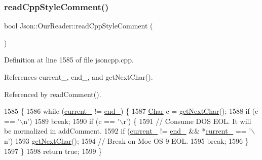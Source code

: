 \mbox{\label{class_json_1_1_our_reader_ae3de80671f0f997053e1c1c8a47a45c5}} 
\subsubsection{\texorpdfstring{read\+Cpp\+Style\+Comment()}{readCppStyleComment()}}
{\footnotesize\ttfamily bool Json\+::\+Our\+Reader\+::read\+Cpp\+Style\+Comment (\begin{DoxyParamCaption}{ }\end{DoxyParamCaption})\hspace{0.3cm}{\ttfamily [private]}}



Definition at line 1585 of file jsoncpp.\+cpp.



References current\+\_\+, end\+\_\+, and get\+Next\+Char().



Referenced by read\+Comment().


\begin{DoxyCode}
1585                                     \{
1586   \textcolor{keywordflow}{while} (\hyperlink{class_json_1_1_our_reader_a5211fbbba94be80a22dd2317c621efcc}{current\_} != \hyperlink{class_json_1_1_our_reader_ab1f69b0260c27a0d2d65dc56e42c8f9d}{end\_}) \{
1587     \hyperlink{class_json_1_1_our_reader_a0cd0bab4caa66594ab843ccd5f9dc239}{Char} c = \hyperlink{class_json_1_1_our_reader_a298285d035fdbc554caae09d9f0a5859}{getNextChar}();
1588     \textcolor{keywordflow}{if} (c == \textcolor{charliteral}{'\(\backslash\)n'})
1589       \textcolor{keywordflow}{break};
1590     \textcolor{keywordflow}{if} (c == \textcolor{charliteral}{'\(\backslash\)r'}) \{
1591       \textcolor{comment}{// Consume DOS EOL. It will be normalized in addComment.}
1592       \textcolor{keywordflow}{if} (\hyperlink{class_json_1_1_our_reader_a5211fbbba94be80a22dd2317c621efcc}{current\_} != \hyperlink{class_json_1_1_our_reader_ab1f69b0260c27a0d2d65dc56e42c8f9d}{end\_} && *\hyperlink{class_json_1_1_our_reader_a5211fbbba94be80a22dd2317c621efcc}{current\_} == \textcolor{charliteral}{'\(\backslash\)n'})
1593         \hyperlink{class_json_1_1_our_reader_a298285d035fdbc554caae09d9f0a5859}{getNextChar}();
1594       \textcolor{comment}{// Break on Moc OS 9 EOL.}
1595       \textcolor{keywordflow}{break};
1596     \}
1597   \}
1598   \textcolor{keywordflow}{return} \textcolor{keyword}{true};
1599 \}
\end{DoxyCode}
\mbox{\label{class_json_1_1_our_reader_aba784b125baa1b62387e767b791f2f89}} 
